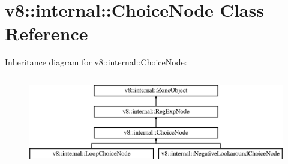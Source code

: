 \hypertarget{classv8_1_1internal_1_1_choice_node}{}\section{v8\+:\+:internal\+:\+:Choice\+Node Class Reference}
\label{classv8_1_1internal_1_1_choice_node}
Inheritance diagram for v8\+:\+:internal\+:\+:Choice\+Node\+:\begin{figure}[H]
\begin{center}
\leavevmode
\includegraphics[height=4.000000cm]{classv8_1_1internal_1_1_choice_node}
\end{center}
\end{figure}
